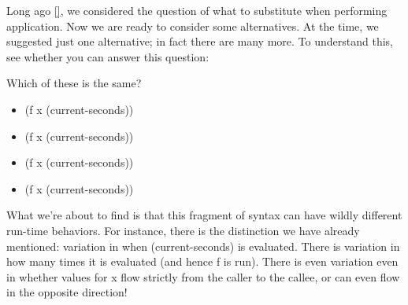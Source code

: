\secdown

Long ago \ref{}, we considered the question of what to substitute when
performing application. Now we are ready to consider some alternatives. At the
time, we suggested just one alternative; in fact there are many more. To
understand this, see whether you can answer this question:

Which of these is the same?
\begin{itemize}[nosep]
  \item 
(f x (current-seconds))
  \item 
(f x (current-seconds))
  \item 
(f x (current-seconds))
\item
(f x (current-seconds))
\end{itemize}

What we’re about to find is that this fragment of syntax can have wildly
different run-time behaviors. For instance, there is the distinction we have
already mentioned: variation in when (current-seconds) is evaluated. There is
variation in how many times it is evaluated (and hence f is run). There is even
variation even in whether values for x flow strictly from the caller to the
callee, or can even flow in the opposite direction!



\secup
